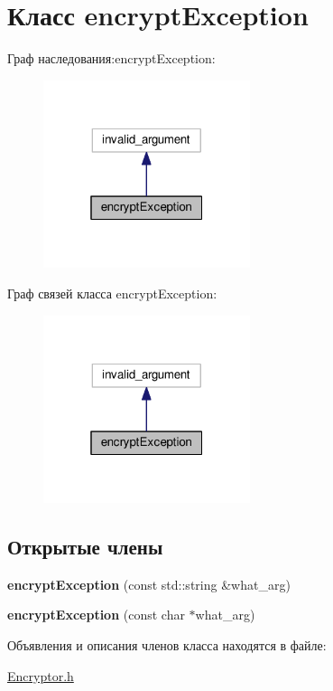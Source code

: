 \hypertarget{classencryptException}{}\section{Класс encrypt\+Exception}
\label{classencryptException}


Граф наследования\+:encrypt\+Exception\+:\nopagebreak
\begin{figure}[H]
\begin{center}
\leavevmode
\includegraphics[width=172pt]{classencryptException__inherit__graph}
\end{center}
\end{figure}


Граф связей класса encrypt\+Exception\+:\nopagebreak
\begin{figure}[H]
\begin{center}
\leavevmode
\includegraphics[width=172pt]{classencryptException__coll__graph}
\end{center}
\end{figure}
\subsection*{Открытые члены}
\begin{DoxyCompactItemize}
\item 
\mbox{\label{classencryptException_a90c941338c8791265579747f93339d1f}} 
{\bfseries encrypt\+Exception} (const std\+::string \&what\+\_\+arg)
\item 
\mbox{\label{classencryptException_aff526f9ad99bc9969d3bb94663b49f22}} 
{\bfseries encrypt\+Exception} (const char $\ast$what\+\_\+arg)
\end{DoxyCompactItemize}


Объявления и описания членов класса находятся в файле\+:\begin{DoxyCompactItemize}
\item 
\hyperlink{Encryptor_8h}{Encryptor.\+h}\end{DoxyCompactItemize}
